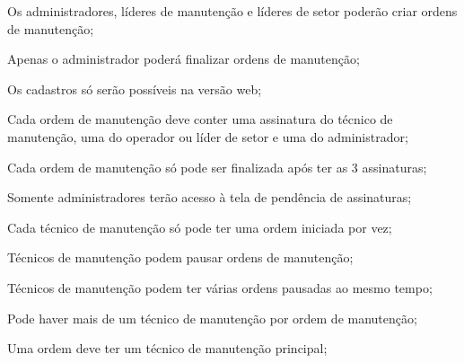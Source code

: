 \begin{subalineas}
	\item {Os administradores, líderes de manutenção e líderes de setor poderão criar ordens de manutenção};
	\item {Apenas o administrador poderá finalizar ordens de manutenção};
	\item {Os cadastros só serão possíveis na versão web};
	\item {Cada ordem de manutenção deve conter uma assinatura do técnico de manutenção, uma do operador ou líder de setor e uma do administrador};
	\item {Cada ordem de manutenção só pode ser finalizada após ter as 3 assinaturas};
	\item {Somente administradores terão acesso à tela de pendência de assinaturas};
	\item {Cada técnico de manutenção só pode ter uma ordem iniciada por vez};
	\item {Técnicos de manutenção podem pausar ordens de manutenção};
	\item {Técnicos de manutenção podem ter várias ordens pausadas ao mesmo tempo};
	\item {Pode haver mais de um técnico de manutenção por ordem de manutenção};
	\item {Uma ordem deve ter um técnico de manutenção principal};
\end{subalineas}




